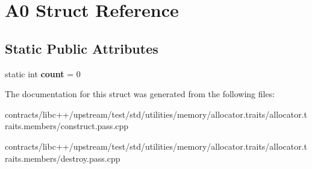 \hypertarget{struct_a0}{}\section{A0 Struct Reference}
\label{struct_a0}
\subsection*{Static Public Attributes}
\begin{DoxyCompactItemize}
\item 
\mbox{\label{struct_a0_ac2c3211fd9aa2974b73f7b0ffe6627ba}} 
static int {\bfseries count} = 0
\end{DoxyCompactItemize}


The documentation for this struct was generated from the following files\+:\begin{DoxyCompactItemize}
\item 
contracts/libc++/upstream/test/std/utilities/memory/allocator.\+traits/allocator.\+traits.\+members/construct.\+pass.\+cpp\item 
contracts/libc++/upstream/test/std/utilities/memory/allocator.\+traits/allocator.\+traits.\+members/destroy.\+pass.\+cpp\end{DoxyCompactItemize}
